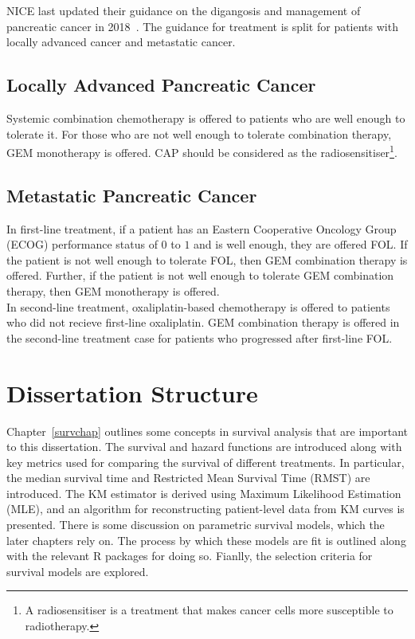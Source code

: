 NICE last updated their guidance on the digangosis and management of pancreatic cancer in 2018~\cite{NG85}. The guidance for treatment is split for patients with locally advanced cancer and metastatic cancer. 

\subsection{Locally Advanced Pancreatic Cancer}
Systemic combination chemotherapy is offered to patients who are well enough to tolerate it. For those who are not well enough to tolerate combination therapy, GEM monotherapy is offered. CAP should be considered as the radiosensitiser\footnote{A radiosensitiser is a treatment that makes cancer cells more susceptible to radiotherapy.}.

\subsection{Metastatic Pancreatic Cancer}
In first-line treatment, if a patient has an Eastern Cooperative Oncology Group (ECOG) performance status of $0$ to $1$ and is well enough, they are offered FOL. If the patient is not well enough to tolerate FOL, then GEM combination therapy is offered. Further, if the patient is not well enough to tolerate GEM combination therapy, then GEM monotherapy is offered.  \\

In second-line treatment, oxaliplatin-based chemotherapy is offered to patients who did not recieve first-line oxaliplatin. GEM combination therapy is offered in the second-line treatment case for patients who progressed after first-line FOL.

\section{Dissertation Structure}
Chapter~\ref{survchap} outlines some concepts in survival analysis that are important to this dissertation. The survival and hazard functions are introduced along with key metrics used for comparing the survival of different treatments. In particular, the median survival time and Restricted Mean Survival Time (RMST) are introduced. The KM estimator is derived using Maximum Likelihood Estimation (MLE), and an algorithm for reconstructing patient-level data from KM curves is presented. There is some discussion on parametric survival models, which the later chapters rely on. The process by which these models are fit is outlined along with the relevant R packages for doing so. Fianlly, the selection criteria for survival models are explored.\\

